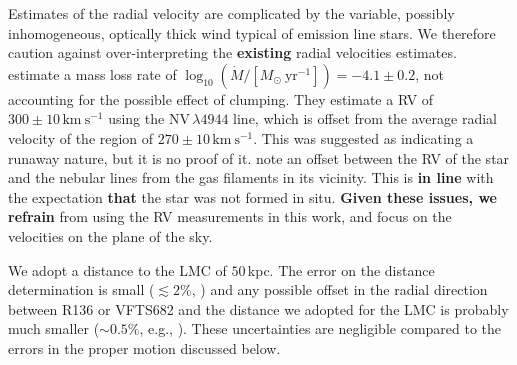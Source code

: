 \documentclass[a4paper,fleqn,usenatbib]{mnras}
\newcommand{\newtext}[1]{{\color{ForestGreen}\bf{#1}}}
\newcommand{\kms}{{\,\mathrm{km\ s^{-1}}}}
\begin{document}
Estimates of the radial velocity are complicated by the variable,
possibly inhomogeneous, optically thick wind  typical of emission line
stars.  We therefore caution
against over-interpreting the \newtext{existing} radial velocities estimates. \citet{bestenlehner:11} estimate a mass loss rate of
$\log_{10}(\dot{M}/[M_\odot \ \mathrm{yr}^{-1}])=-4.1\pm0.2$, not accounting for the
possible effect of clumping.  %
They estimate a RV of
$300\pm10\kms$ using the  N{\footnotesize V}\,$\lambda4944$ line, which
is offset from the average radial velocity of the region of
$270\pm10\kms$. This was suggested as indicating a runaway nature, but
it is no proof of it. %
\cite{bressert:12} note an offset between the RV of
the star and the nebular lines from the gas filaments in its
vicinity. This is \newtext{in line} with the expectation \newtext{that} the star was not
formed in situ. \newtext{Given these issues, we refrain} from using the RV measurements in this
work, and focus on the velocities on the plane of the sky. 

We adopt a distance to the LMC of $50$\,kpc. The error on
the distance determination is small ($\lesssim2\%$,
\citealt{pietrzynski:13}) and any possible offset in the radial
direction between R136 or VFTS682 and the distance we adopted for the
LMC is probably much smaller ($\sim$$0.5\%$, e.g., \citealt{luks:92}). These uncertainties are negligible compared to the errors in the proper motion discussed below.  
\end{document}
